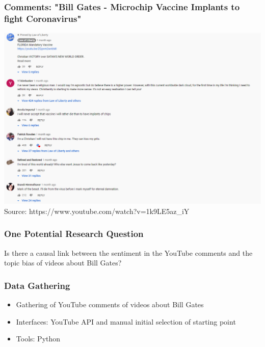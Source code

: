 \documentclass{beamer}
\begin{document}
\begin{frame}
\frametitle{Comments: "Bill Gates - Microchip Vaccine Implants to fight Coronavirus"
}
\includegraphics[height=0.7\textheight]{BillGatesmandatoryvaccines}
Source: https://www.youtube.com/watch?v=1k9LE5az\_iY
\end{frame}	
\begin{frame}
\frametitle{One Potential Research Question}
\begin{center}
Is there a causal link between the sentiment in the YouTube comments and the topic bias of videos about Bill Gates?
\end{center}

\end{frame}	


\begin{frame}
\frametitle{Data Gathering}

\begin{itemize}
	\item Gathering of YouTube comments of videos about Bill Gates
	\item Interfaces: YouTube API and manual initial selection of starting point
	\item Tools: Python 
	
\end{itemize}
\end{frame}	
\end{document}
